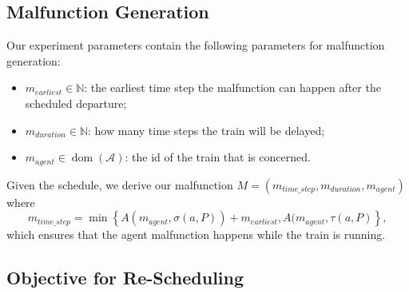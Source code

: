 \documentclass{article}
\DeclareMathOperator{\dom}{dom}
\begin{document}
\subsection{Malfunction Generation}\label{subsubsec:malfunctiongeneration}

Our experiment parameters contain the following parameters for malfunction generation:
\begin{itemize}
    \item $m_{earliest} \in \mathbb{N}$: the earliest time step the malfunction can happen after the scheduled departure;
    \item $m_{duration} \in \mathbb{N}$: how many time steps the train will be delayed;
    \item $m_{agent} \in \dom(\mathcal{A})$: the id of the train that is concerned.
\end{itemize}

Given the schedule, we derive our malfunction $M=(m_{time\_step},m_{duration},m_{agent})$ where
\begin{equation*}
m_{time\_step} = \min \left\{  A(m_{agent},\sigma(a, P)) + m_{earliest},  A(m_{agent},\tau(a,P) \right\},
\end{equation*}
which ensures that the agent malfunction happens while the train is running.




\subsection{Objective for Re-Scheduling}\label{subec:objectiveresched}
\end{document}

